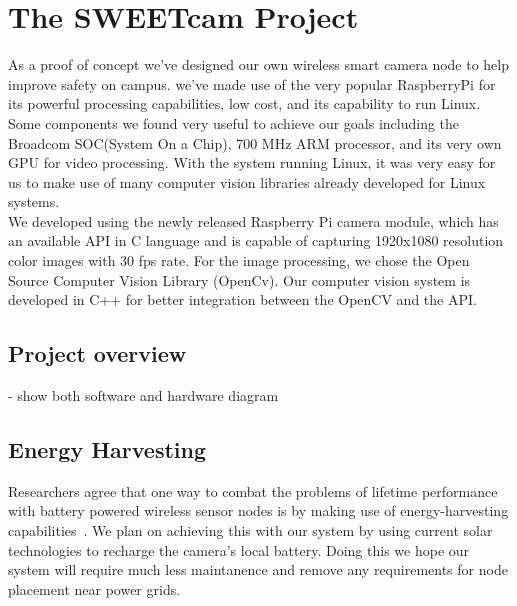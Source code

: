 \documentclass[journal,transmag]{IEEEtran}
\begin{document}
\section{The SWEETcam Project}
As a proof of concept we've designed our own wireless smart camera node to help improve safety on campus. we've made use of the very popular RaspberryPi for
its powerful processing capabilities, low cost, and its capability to run Linux. Some components we found very useful to achieve our goals including the 
Broadcom SOC(System On a Chip), 700 MHz ARM processor, and its very own GPU for video processing. With the system running Linux, it was very easy for us to
make use of many computer vision libraries already developed for Linux systems.\\
We developed using the newly released Raspberry Pi camera module, which has an available API in C language and is capable of capturing 1920x1080 resolution
color images with 30 fps rate. For the image processing, we chose the Open Source Computer Vision Library (OpenCv). Our computer vision system is developed in 
C++ for better integration between the OpenCV and the API.

\subsection{Project overview}

\-- show both software and hardware diagram

\subsection{Energy Harvesting}
Researchers agree that one way to combat the problems of lifetime performance with battery powered wireless sensor nodes is by making use of energy-harvesting
capabilities~\cite{EnergyHarvesting}. We plan on achieving this with our system by using current solar technologies to recharge the camera's local battery. 
Doing this we hope our system will require much less maintanence and remove any requirements for node placement near power grids.
\end{document}
